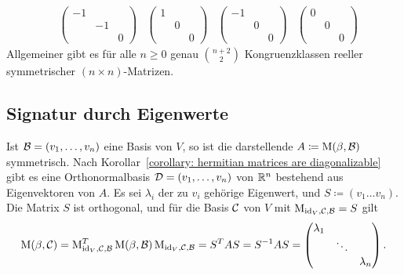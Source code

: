 \begin{example}
\[\begin{matrix}
    &
      \begin{pmatrix}
        -1  &    &   \\
            & -1 &   \\
            &    & 0
      \end{pmatrix}
    &
      \begin{pmatrix}
        1 &   &   \\
          & 0 &   \\
          &   & 0
      \end{pmatrix}
    &
      \begin{pmatrix}
        -1  &   &   \\
            & 0 &   \\
            &   & 0
      \end{pmatrix}
    &
      \begin{pmatrix}
        0 &   &   \\
          & 0 &   \\
          &   & 0
      \end{pmatrix}
    \end{matrix}
  \]
  Allgemeiner gibt es für alle $n \geq 0$ genau $\binom{n+2}{2}$ Kongruenzklassen reeller symmetrischer $(n \times n)$-Matrizen.
\end{example}



\subsection*{Signatur durch Eigenwerte}

Ist $\mathcal{B} = (v_1, \dotsc, v_n)$ eine Basis von $V$, so ist die darstellende $A \coloneqq \operatorname{M}(\beta, \mathcal{B})$ symmetrisch.
Nach Korollar~\ref{corollary: hermitian matrices are diagonalizable} gibt es eine Orthonormalbasis $\mathcal{D} = (v_1, \dotsc, v_n)$ von $\mathbb{R}^n$ bestehend aus Eigenvektoren von $A$.
Es sei $\lambda_i$ der zu $v_i$ gehörige Eigenwert, und $S \coloneqq (v_1 \dotsc v_n)$.
Die Matrix $S$ ist orthogonal, und für die Basis $\mathcal{C}$ von $V$ mit $\operatorname{M}_{\operatorname{id}_V, \mathcal{C}, \mathcal{B}} = S$ gilt
\[
    \operatorname{M}(\beta, \mathcal{C})
  = \operatorname{M}_{\operatorname{id}_V, \mathcal{C}, \mathcal{B}} ^T
    \operatorname{M}(\beta, \mathcal{B})
    \operatorname{M}_{\operatorname{id}_V, \mathcal{C}, \mathcal{B}}
  = S^T A S
  = S^{-1} A S
  = \begin{pmatrix}
      \lambda_1 &         &           \\
                & \ddots  &           \\
                &         & \lambda_n
    \end{pmatrix}.
\]


